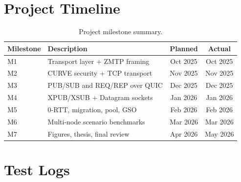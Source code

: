 \documentclass[12pt, a4paper, oneside]{report}
\begin{document}
\chapter{Project Timeline}
\label{app:gantt}

\begin{table}[H]
  \centering
  \caption{Project milestone summary.}
  \label{tab:gantt}
  \begin{tabular}{llcc}
    \toprule
    \textbf{Milestone} & \textbf{Description} & \textbf{Planned} & \textbf{Actual} \\
    \midrule
    M1 & Transport layer + ZMTP framing   & Oct 2025 & Oct 2025 \\
    M2 & CURVE security + TCP transport   & Nov 2025 & Nov 2025 \\
    M3 & PUB/SUB and REQ/REP over QUIC   & Dec 2025 & Dec 2025 \\
    M4 & XPUB/XSUB + Datagram sockets    & Jan 2026 & Jan 2026 \\
    M5 & 0-RTT, migration, pool, GSO     & Feb 2026 & Feb 2026 \\
    M6 & Multi-node scenario benchmarks  & Mar 2026 & Mar 2026 \\
    M7 & Figures, thesis, final review   & Apr 2026 & May 2026 \\
    \bottomrule
  \end{tabular}
\end{table}

\chapter{Test Logs}
\label{app:testlogs}
\end{document}
